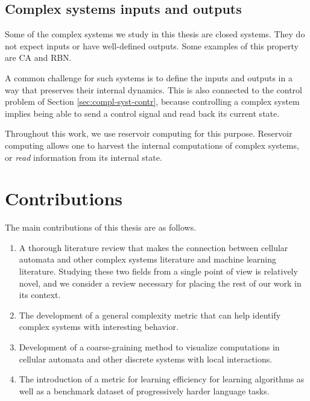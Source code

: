 \subsection{Complex systems inputs and outputs}

Some of the complex systems we study in this thesis are closed systems. They do
not expect inputs or have well-defined outputs. Some examples of this
property are \ac{CA} and \ac{RBN}.

A common challenge for such
systems is to define the inputs and outputs in a way that preserves their internal
dynamics. This is also connected to the control problem of Section
\ref{sec:compl-syst-contr}, because controlling a complex system implies being
able to send a control signal and read back its current state.

Throughout this work, we use reservoir computing for this purpose.
Reservoir computing allows one to harvest the internal computations of complex
systems, or \emph{read} information from its internal state.


\section{Contributions}

The main contributions of this thesis are as follows.
\begin{enumerate}
  \item A thorough literature review that makes the connection between cellular
        automata and other complex systems literature and machine learning
        literature. Studying these two fields from a single point of view is
        relatively novel, and we consider a review necessary for placing the
        rest of our work in its context.

  \item The development of a general complexity metric that can help identify
        complex systems with interesting behavior.

  \item Development of a coarse-graining method to visualize computations
        in cellular automata and other discrete systems with local interactions.

  \item The introduction of a metric for learning efficiency for learning
        algorithms as well as a benchmark dataset of progressively harder
        language tasks.
\end{enumerate}

